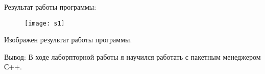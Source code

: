 \endgroup
\begin{center}
Результат работы программы:
\end{center}
\begin{figure}[h!]
	\centering
	\texttt{[image: s1]}
	\label{fig:s1}
\end{figure}
Изображен результат работы программы.

Вывод: В ходе лаборпторной работы я научился работать с пакетным менеджером С++.



